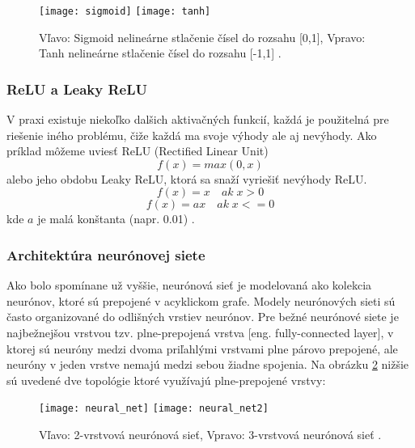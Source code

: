 \begin{figure}[H]
    \centering
    \texttt{[image: sigmoid]}
    \qquad
    \texttt{[image: tanh]}
    \caption{
        Vľavo: Sigmoid nelineárne stlačenie čísel do rozsahu [0,1],
        Vpravo: Tanh nelineárne stlačenie čísel do rozsahu [-1,1] \cite{odkaz:ConvolutionalNeuralNetworkCS231n}.
    }
    \label{pic:ActivationFunctions}
\end{figure}

\subsubsection{ReLU a Leaky ReLU}
V praxi existuje niekoľko dalšich aktivačných funkcií, každá je použitelná pre riešenie iného problému,
    čiže každá ma svoje výhody ale aj nevýhody.
Ako príklad môžeme uviesť ReLU (Rectified Linear Unit)
\begin{equation}
    f(x) = max(0,x)
\end{equation}
alebo jeho obdobu Leaky ReLU, ktorá sa snaží vyriešiť nevýhody ReLU.
\begin{equation}
    f(x) = x \quad ak \; x > 0
\end{equation}
\begin{equation}
    f(x) = ax \quad ak \; x <= 0
\end{equation}
kde $a$ je malá konštanta (napr. 0.01) \cite{odkaz:ConvolutionalNeuralNetworkCS231n}.

\subsubsection{Architektúra neurónovej siete}
Ako bolo spomínane už vyššie, neurónová sieť je modelovaná ako kolekcia neurónov, ktoré sú prepojené v acyklickom grafe.
Modely neurónových sieti sú často organizované do odlišných vrstiev neurónov.
Pre bežné neurónové siete je najbežnejšou vrstvou tzv. plne-prepojená vrstva [eng. fully-connected layer],
    v ktorej sú neuróny medzi dvoma priľahlými vrstvami plne párovo prepojené, ale neuróny v jeden vrstve nemajú medzi sebou žiadne spojenia.
Na obrázku \ref{pic:NeuralNetworkArchitecture} nižšie sú uvedené dve topológie ktoré využívajú plne-prepojené vrstvy\cite{odkaz:ConvolutionalNeuralNetworkCS231n}:
\begin{figure}[H]
    \centering
    \texttt{[image: neural\_net]}
    \qquad
    \texttt{[image: neural\_net2]}
    \caption{Vľavo: 2-vrstvová neurónová sieť, Vpravo: 3-vrstvová neurónová sieť \cite{odkaz:ConvolutionalNeuralNetworkCS231n}.}
    \label{pic:NeuralNetworkArchitecture}
\end{figure}

